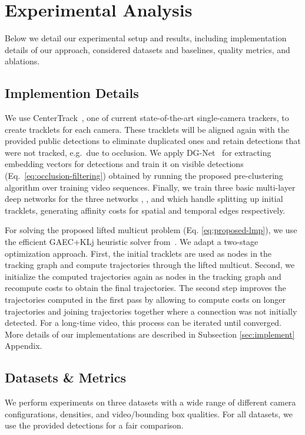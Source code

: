 \section{Experimental Analysis}
Below we detail our experimental setup and results, including implementation details of our approach, considered datasets and baselines, quality metrics, and ablations.





\subsection{Implemention Details}

We use CenterTrack~\cite{zhou2020tracking}, one of current state-of-the-art single-camera trackers, to create tracklets for each camera.
These tracklets will be aligned again with the provided public detections to eliminate duplicated ones and retain detections that were not tracked, e.g.\ due to occlusion.
We apply DG-Net~\cite{zheng2019joint} for extracting embedding vectors for detections and train it on visible detections (Eq.~\ref{eq:occlusion-filtering}) obtained by running the proposed pre-clustering algorithm over training video sequences.
Finally, we train three basic multi-layer deep networks for the three networks , , and  which handle splitting up initial tracklets, generating affinity costs for spatial and temporal edges respectively.

For solving the proposed lifted multicut problem (Eq. \ref{eq:proposed-lmp}), we use the efficient GAEC+KLj heuristic solver from~\cite{keuper2015lifted}.
We adapt a two-stage optimization approach. First, the initial tracklets are used as nodes in the tracking graph and compute trajectories through the lifted multicut.
Second, we initialize the computed trajectories again as nodes in the tracking graph and recompute costs to obtain the final trajectories. The second step improves the trajectories computed in the first pass by allowing to compute costs on longer trajectories and joining trajectories together where a connection was not initially detected. For a long-time video, this process can be iterated until converged. More details of our implementations are described in Subsection \ref{sec:implement} Appendix.


\subsection{Datasets \& Metrics}
We perform experiments on three datasets with a wide range of different camera configurations, densities, and video/bounding box qualities.
For all datasets, we use the provided detections for a fair comparison.

